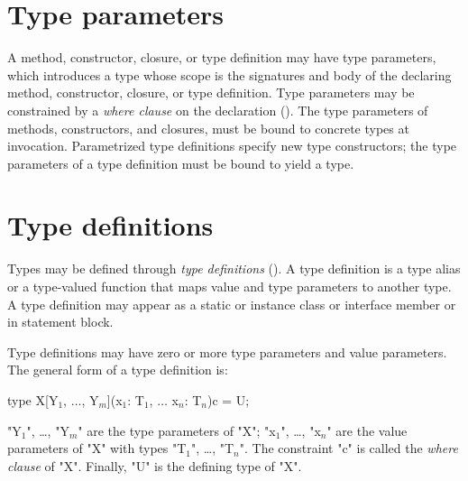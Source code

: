 \section{Type parameters}
\label{TypeParameters}


        A method, constructor, closure, or type definition
        may have type parameters, which
        introduces a type whose scope is the signatures and body
        of the declaring method, constructor, closure, or type
        definition.
        Type parameters may be constrained by a {\em where
        clause} on the declaration ().
        The type parameters of methods, constructors, and
        closures, must be bound to
        concrete types at invocation.
        Parametrized type definitions specify new type
        constructors; the type parameters of a type definition must be bound
        to yield a type.

\section{Type definitions}
\label{TypeDefs}


        Types may be defined through {\em type definitions}
        ().
        A type definition is a type alias or a type-valued function
        that maps value and type parameters to another type.
        A type definition may appear as a static or instance
        class or interface
        member or in statement block.

        Type definitions may have zero or more type parameters
        and value parameters.
The general form of a type definition is:

\begin{xtenmath}
type X[Y$_1$, $\dots$, Y$_m$](x$_1$: T$_1$, $\dots$ x$_n$: T$_n$){c} = U;
\end{xtenmath}

\xcdmath"Y$_1$", \dots, \xcdmath"Y$_m$"
are the type parameters of \xcd"X";
\xcdmath"x$_1$", \dots, \xcdmath"x$_n$"
are the value parameters of \xcd"X" with types
\xcdmath"T$_1$", \dots, \xcdmath"T$_n$".
The constraint \xcd"c" is called the \emph{where clause} of
\xcd"X".  Finally, \xcd"U" is the defining type of \xcd"X".

